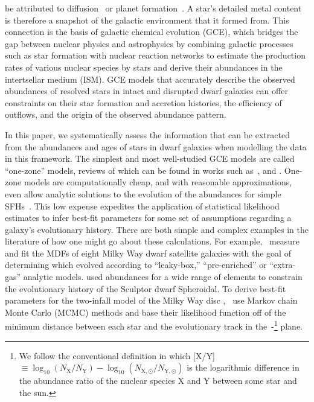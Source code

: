 \documentclass[foo.tex]{subfiles}
\begin{document}
be attributed to diffusion~\citep{BertelliMotta2018, Liu2019, Souto2019} or
planet formation~\citep{Melendez2009, Liu2016a, Spina2018}.
A star's detailed metal content is therefore a snapshot of the galactic
environment that it formed from.
This connection is the basis of galactic chemical evolution (GCE), which
bridges the gap between nuclear physics and astrophysics by combining galactic
processes such as star formation with nuclear reaction networks to estimate the
production rates of various nuclear species by stars and derive their
abundances in the intertsellar medium (ISM).
GCE models that accurately describe the observed abundances of resolved stars
in intact and disrupted dwarf galaxies can offer constraints on their star
formation and accretion histories, the efficiency of outflows, and the origin
of the observed abundance pattern.
\par
In this paper, we systematically assess the information that can be extracted
from the abundances and ages of stars in dwarf galaxies when modelling the
data in this framework.
The simplest and most well-studied GCE models are called ``one-zone'' models,
reviews of which can be found in works such as~\citet{Tinsley1980},
\citet{Pagel2009} and \citet{Matteucci2012, Matteucci2021}.
One-zone models are computationally cheap, and with reasonable approximations,
even allow analytic solutions to the evolution of the abundances for simple
SFHs~\citep*[e.g.,][]{Weinberg2017}.
This low expense expedites the application of statistical likelihood estimates
to infer best-fit parameters for some set of assumptions regarding a galaxy's
evolutionary history.
There are both simple and complex examples in the literature of how one might
go about these calculations.
For example,~\citet{Kirby2011} measure and fit the MDFs of eight Milky Way
dwarf satellite galaxies with the goal of determining which evolved according
to ``leaky-box,'' ``pre-enriched'' or ``extra-gas'' analytic models.
\citet{delosReyes2022} used abundances for a wide range of elements to
constrain the evolutionary history of the Sculptor dwarf Spheroidal.
To derive best-fit parameters for the two-infall model of the Milky Way disc
\citep[e.g.,][]{Chiappini1997},~\citet{Spitoni2020, Spitoni2021} use Markov
chain Monte Carlo (MCMC) methods and base their likelihood function off of the
minimum distance between each star and the evolutionary track in
the~\afe-\feh\footnote{
	We follow the conventional definition in which
	[X/Y]~$\equiv \log_{10}(N_\text{X} / N_\text{Y}) -
	\log_{10}(N_{\text{X},\odot} / N_{\text{Y},\odot})$
	is the logarithmic difference in the abundance ratio of the nuclear species
	X and Y between some star and the sun.
} plane.
\end{document}
